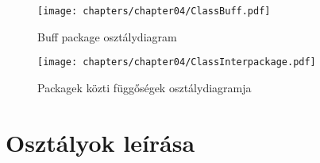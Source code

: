 \begin{figure}[h]
	\begin{center}
		\texttt{[image: chapters/chapter04/ClassBuff.pdf]}
		\caption{Buff package osztálydiagram}
		\label{Buff package osztálydiagram}
	\end{center}
\end{figure}


\begin{figure}[h]
	\begin{center}
		\texttt{[image: chapters/chapter04/ClassInterpackage.pdf]}
		\caption{Packagek közti függőségek osztálydiagramja}
		\label{Packagek közti függőségek osztálydiagramja}
	\end{center}
\end{figure}

\clearpage

\section{Osztályok leírása}

